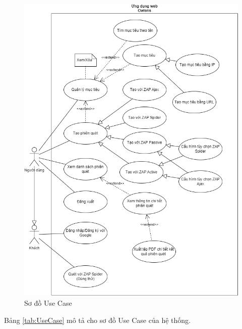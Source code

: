 \begin{figure}[H]
      \centering
      \includegraphics[width=\textwidth]{applied-thesis-chapters/chapter-3/Sơ đồ Use Case.png}
      \caption{Sơ đồ Use Case}
      \label{fig:UseCase}
\end{figure}

Bảng \ref{tab:UseCase} mô tả cho sơ đồ Use Case của hệ thống.

